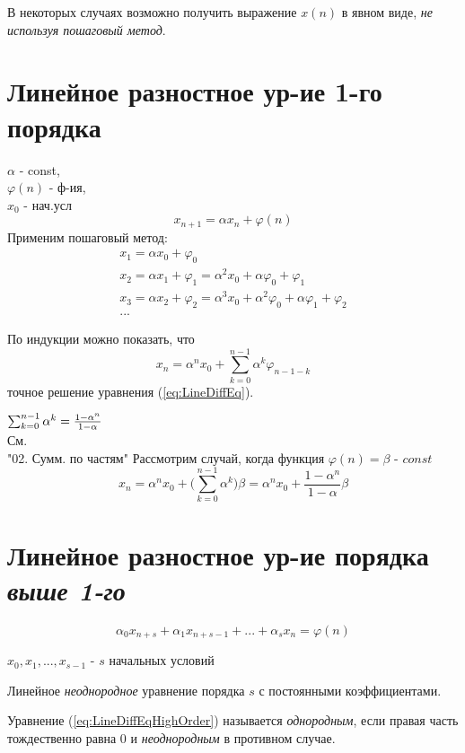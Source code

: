 \documentclass[a4paper,11pt]{article}
\begin{document}
  В некоторых случаях возможно получить выражение $x(n)$ в явном виде, \textit{не используя пошаговый метод}.

\section{Линейное разностное ур-ие 1-го порядка}
  \marginpar
  {
    \footnotesize
    {
      $\alpha$ - const, \\
      $\varphi(n)$ - ф-ия, \\
      $x_0$ - нач.усл
    }
  }
  \begin{equation}
    x_{n+1}=\alpha x_n + \varphi(n)
    \label{eq:LineDiffEq}
  \end{equation}
  Применим пошаговый метод:
  \begin{gather*}
    x_1 = \alpha x_0 + \varphi_0 \\
    x_2 = \alpha x_1 + \varphi_1 = \alpha^2 x_0 + \alpha \varphi_0 + \varphi_1 \\
    x_3 = \alpha x_2 + \varphi_2 = \alpha^3 x_0 + \alpha^2 \varphi_0 + \alpha \varphi_1 + \varphi_2 \\
    ...
  \end{gather*}
  \begin{importantblock}
    По индукции можно показать, что
    \begin{equation}
      x_n = \alpha^n x_0 + \sum_{k=0}^{n-1} \alpha^k \varphi_{n-1-k}
      \end{equation}
    точное решение уравнения (\ref{eq:LineDiffEq}).
  \end{importantblock}
  \marginpar
  {
    \small{$\sum_{k=0}^{n-1} \alpha^k \\ = \frac{1-\alpha^n}{1-\alpha}$ \\}
    \footnotesize{См. \\ "02. Сумм. по частям"}
  }
  Рассмотрим случай, когда функция $\varphi(n)=\beta$ - $const$
  \begin{equation}
    x_n = \alpha^n x_0 + \bigg(\sum_{k=0}^{n-1}\alpha^k \bigg) \beta = \alpha^n x_0 + \frac{1-\alpha^n}{1-\alpha} \beta
  \end{equation}

\section{Линейное разностное ур-ие порядка \textit{выше 1-го}}
  \begin{equation}
    \alpha_0 x_{n+s} + \alpha_1 x_{n+s-1} +...+ \alpha_s x_n = \varphi(n)
    \label{eq:LineDiffEqHighOrder}
  \end{equation}
  \begin{center}
    $x_0, x_1, ..., x_{s-1}$ - $s$ начальных условий
  \end{center}
  Линейное \textit{неоднородное} уравнение порядка $s$ с постоянными коэффициентами.
  \begin{importantblock}
    Уравнение (\ref{eq:LineDiffEqHighOrder}) называется \textit{однородным}, если правая часть тождественно равна $0$ и \textit{неоднородным} в противном случае.
  \end{importantblock}
\end{document}
